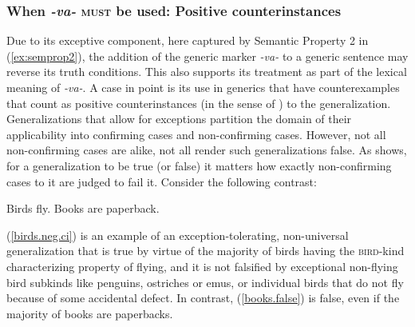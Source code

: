 \documentclass[output=paper,colorlinks,citecolor=brown]{langscibook}
\begin{document}
\subsubsection{When \emph{-va-} \textsc{must} be used: Positive counterinstances}\label{mustbeused}

Due to its exceptive component, here captured by Semantic Property 2 in (\ref{ex:semprop2}), the addition of the generic marker \textit{-va-} to a generic sentence may reverse its truth conditions.
This also supports its treatment as part of the lexical meaning of \textit{-va-}.
A case in point is its use in generics that have counterexamples
that count as positive counterinstances (in the sense of \citealt{leslie2008}) to the generalization.
Generalizations that allow for exceptions
partition the domain of their applicability into confirming cases and non-confirming cases. However, not all non-confirming cases are alike, not all render such generalizations false.
As \citet{leslie2008} shows, for a generalization to be true (or false) it matters how exactly non-confirming cases to it are judged to fail it. Consider the following contrast:

\ea
\ea \label{birds.neg.ci} Birds fly.
\ex \label{books.false} Books are paperback.
\z
\z

\noindent
(\ref{birds.neg.ci}) is an example of an exception-tolerating, non-universal generalization that is true
by virtue of the majority of birds having the \textsc{bird}-kind characterizing property of flying,
and it is not falsified by exceptional non-flying bird subkinds like penguins, ostriches or emus, or individual birds that do not fly because of some accidental
defect. In contrast, (\ref{books.false}) is false, even if the majority of
books are paperbacks.
\end{document}
